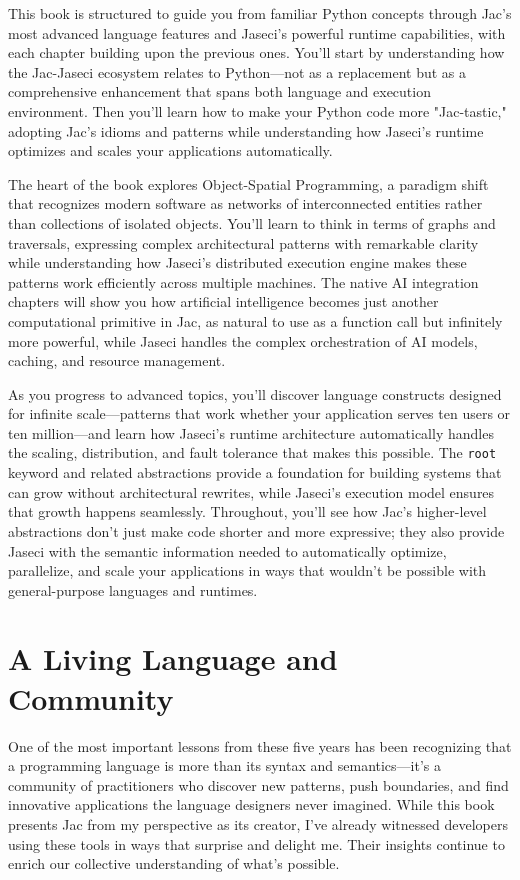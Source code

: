 This book is structured to guide you from familiar Python concepts through Jac's most advanced language features and Jaseci's powerful runtime capabilities, with each chapter building upon the previous ones. You'll start by understanding how the Jac-Jaseci ecosystem relates to Python—not as a replacement but as a comprehensive enhancement that spans both language and execution environment. Then you'll learn how to make your Python code more "Jac-tastic," adopting Jac's idioms and patterns while understanding how Jaseci's runtime optimizes and scales your applications automatically.

The heart of the book explores Object-Spatial Programming, a paradigm shift that recognizes modern software as networks of interconnected entities rather than collections of isolated objects. You'll learn to think in terms of graphs and traversals, expressing complex architectural patterns with remarkable clarity while understanding how Jaseci's distributed execution engine makes these patterns work efficiently across multiple machines. The native AI integration chapters will show you how artificial intelligence becomes just another computational primitive in Jac, as natural to use as a function call but infinitely more powerful, while Jaseci handles the complex orchestration of AI models, caching, and resource management.

As you progress to advanced topics, you'll discover language constructs designed for infinite scale—patterns that work whether your application serves ten users or ten million—and learn how Jaseci's runtime architecture automatically handles the scaling, distribution, and fault tolerance that makes this possible. The \texttt{root} keyword and related abstractions provide a foundation for building systems that can grow without architectural rewrites, while Jaseci's execution model ensures that growth happens seamlessly. Throughout, you'll see how Jac's higher-level abstractions don't just make code shorter and more expressive; they also provide Jaseci with the semantic information needed to automatically optimize, parallelize, and scale your applications in ways that wouldn't be possible with general-purpose languages and runtimes.

\section{A Living Language and Community}

One of the most important lessons from these five years has been recognizing that a programming language is more than its syntax and semantics—it's a community of practitioners who discover new patterns, push boundaries, and find innovative applications the language designers never imagined. While this book presents Jac from my perspective as its creator, I've already witnessed developers using these tools in ways that surprise and delight me. Their insights continue to enrich our collective understanding of what's possible.

